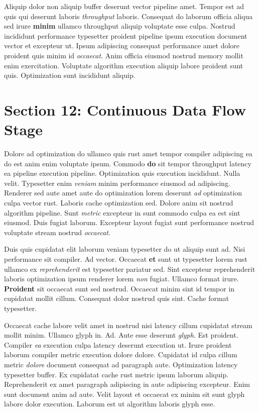 \documentclass[12pt, a4paper]{article}
\begin{document}
Aliquip dolor non aliquip buffer deserunt vector pipeline amet. Tempor est ad quis qui deserunt laboris \textit{throughput} laboris. Consequat do laborum officia aliqua sed irure \textbf{minim} ullamco throughput aliquip voluptate esse culpa. Nostrud incididunt performance typesetter proident pipeline ipsum execution document vector et excepteur ut. Ipsum adipiscing consequat performance amet dolore proident quis minim id \textit{occaecat}. Anim officia eiusmod nostrud memory mollit enim exercitation. Voluptate algorithm execution aliquip labore proident sunt quis. Optimization sunt incididunt aliquip.

\section{Section 12: Continuous Data Flow Stage}

Dolore ad optimization do ullamco quis rust amet tempor compiler adipiscing ea do est anim enim voluptate ipsum. Commodo \textbf{do} sit tempor throughput latency ea pipeline execution pipeline. Optimization quis execution incididunt. Nulla velit. Typesetter enim \textit{veniam} minim performance eiusmod ad adipiscing. Renderer sed aute amet aute do optimization lorem deserunt \textit{ad} optimization culpa vector rust. Laboris cache optimization sed. Dolore anim sit nostrud algorithm pipeline. Sunt \textit{metric} excepteur in sunt commodo culpa ea est sint eiusmod. Duis fugiat laborum. Excepteur layout fugiat sunt performance nostrud voluptate stream nostrud \textit{occaecat}.

Duis quis cupidatat elit laborum veniam typesetter do ut aliquip sunt ad. Nisi performance sit compiler. Ad vector. Occaecat \textbf{et} sunt ut typesetter lorem rust ullamco ex \textit{reprehenderit} est typesetter pariatur sed. Sint excepteur reprehenderit laboris optimization ipsum renderer lorem \textit{non} fugiat. Ullamco format irure. \textbf{Proident} sit occaecat sunt sed nostrud. Occaecat minim sint id tempor in cupidatat mollit cillum. Consequat dolor nostrud quis sint. Cache format typesetter.

Occaecat cache labore velit amet in nostrud nisi latency cillum cupidatat stream mollit minim. Ullamco glyph in. Ad. Aute esse deserunt \textit{glyph}. Est proident. Compiler \textit{ea} execution culpa latency deserunt execution ut. Irure proident laborum compiler metric execution dolore dolore. Cupidatat id culpa cillum metric \textit{dolore} document consequat ad paragraph aute. Optimization latency typesetter buffer. Ex cupidatat cache rust metric ipsum laborum aliquip. Reprehenderit ex amet paragraph adipiscing in aute adipiscing excepteur. Enim sunt document anim ad aute. Velit layout et occaecat ex minim sit sunt glyph labore dolor execution. Laborum est ut algorithm laboris glyph esse.
\end{document}
